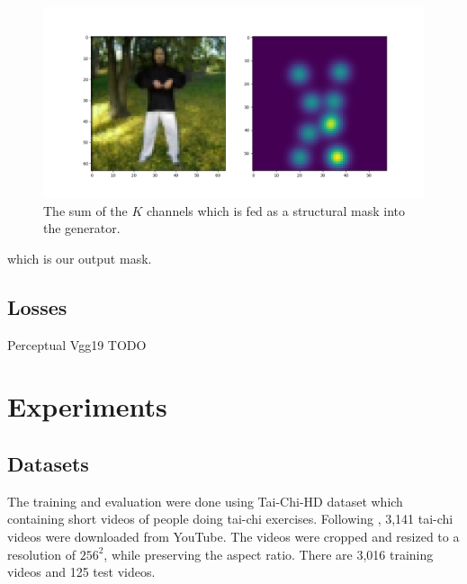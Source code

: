 \documentclass{article}
\begin{document}
\begin{figure}[ht]
\vskip 0.2in
\begin{center}
\centerline{\includegraphics[width=\columnwidth]{softmax_sumkp}}
\caption{
The sum of the $K$ channels which is fed as a structural mask into the
generator.
}
\label{softmax-sum}
\end{center}
\vskip -0.2in
\end{figure}
which is our output mask.


\subsection{Losses}
Perceptual Vgg19 \cite{simonyan2015deep}
TODO

\section{Experiments}
\subsection{Datasets}
The training and evaluation were done using Tai-Chi-HD dataset which containing short videos of people doing tai-chi exercises. Following \cite{siarohin2020order}, 3,141 tai-chi videos were downloaded from YouTube. The videos were cropped and resized to a resolution of $256^2$, while preserving the aspect ratio. There are 3,016 training videos and 125 test videos.
\end{document}

